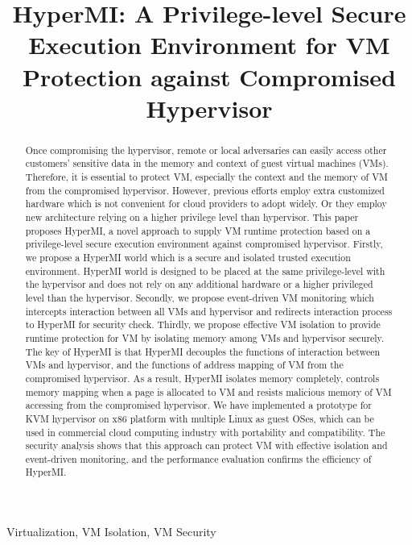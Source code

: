 \documentclass[conference]{IEEEtran}
\begin{document}
\title{HyperMI: A Privilege-level Secure Execution Environment for VM Protection against Compromised Hypervisor}
\author{
\IEEEauthorblockA{\textit{Institute of Information Engineering, Chinese Academy of Sciences} \\
\textit{School of Cyber Security, University of Chinese Academy of Sciences}\\
\{liuwenqing,linkunli,zhangkun,tubibo\}@iie.ac.cn}
}
\maketitle
\begin{abstract}
Once compromising the hypervisor, remote or local adversaries can easily access other customers' sensitive data in the memory and context of guest virtual machines (VMs).
Therefore, it is essential to protect VM, especially the context and the memory of VM from the compromised hypervisor.
However, previous efforts employ extra customized hardware which is not convenient for cloud providers to adopt widely. Or they employ new architecture relying on a higher privilege level than hypervisor. 
This paper proposes HyperMI, a novel approach to supply VM runtime protection based on a privilege-level secure execution environment against compromised hypervisor. 
Firstly, we propose a HyperMI world which is a secure and isolated trusted execution environment. HyperMI world is designed to be placed at the same privilege-level with the hypervisor and does not rely on any additional hardware or a higher privileged level than the hypervisor. Secondly, we propose event-driven VM monitoring which intercepts interaction between all VMs and hypervisor and redirects interaction process to HyperMI for security check. Thirdly, we propose effective VM isolation to provide runtime protection for VM by isolating memory among VMs and hypervisor securely. 
The key of HyperMI is that HyperMI decouples the functions of interaction between VMs and hypervisor, and the functions of address mapping of VM from the compromised hypervisor. As a result, HyperMI isolates memory completely, controls memory mapping when a page is allocated to VM and resists malicious memory of VM accessing from the compromised hypervisor.
We have implemented a prototype for KVM hypervisor on x86 platform with multiple Linux as guest OSes, which can be used in commercial cloud computing industry with portability and compatibility. The security analysis shows that this approach can protect VM with effective isolation and event-driven monitoring, and the performance evaluation confirms the efficiency of HyperMI.
\end{abstract}
\begin{IEEEkeywords}
Virtualization, VM Isolation, VM Security
\end{IEEEkeywords}
\end{document}
